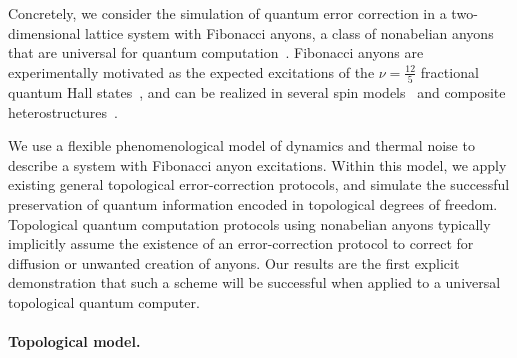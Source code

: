 \documentclass[aps, prl, letterpaper, twocolumn, superscriptaddress, notitlepage, 10pt]{revtex4-1}
\begin{document}
Concretely, we consider the simulation of quantum error correction in a two-dimensional lattice 
system with Fibonacci anyons, a class of nonabelian anyons that are universal for quantum 
computation~\cite{Freedman2002, Nayak2008}. Fibonacci anyons are experimentally motivated as the 
expected excitations of the $\nu=\frac{12}{5}$ fractional quantum Hall 
states~\cite{Slingerland2001}, and can be realized in several spin 
models~\cite{Levin2005, Bonesteel2012, Kapit2013, Palumbo2014} and composite 
heterostructures~\cite{Mong2014}.

We use a flexible phenomenological model of dynamics and thermal 
noise to describe a system with Fibonacci anyon excitations. Within 
this model, we apply existing general topological error-correction protocols, and 
simulate the successful preservation of quantum information encoded in topological 
degrees of freedom. Topological quantum computation protocols using nonabelian anyons 
typically implicitly assume the existence of an error-correction protocol to 
correct for diffusion or unwanted creation of anyons. Our results 
are the first explicit demonstration that such a scheme will 
be successful when applied to a universal topological quantum computer.

\paragraph{Topological model.}
\end{document}
